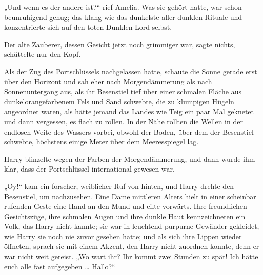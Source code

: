 „Und wenn es der andere ist?“ rief Amelia. Was sie gehört hatte, war schon beunruhigend genug; das klang wie das dunkelste aller dunklen Rituale und konzentrierte sich auf den toten Dunklen Lord selbst.

Der alte Zauberer, dessen Gesicht jetzt noch grimmiger war, sagte nichts, schüttelte nur den Kopf.

\later

Als der Zug des Portschlüssels nachgelassen hatte, schaute die Sonne gerade erst über den Horizont und sah eher nach Morgendämmerung als nach Sonnenuntergang aus, als ihr Besenstiel tief über einer schmalen Fläche aus dunkelorangefarbenem Fels und Sand schwebte, die zu klumpigen Hügeln angeordnet waren, als hätte jemand das Landes wie Teig ein paar Mal geknetet und dann vergessen, es flach zu rollen. In der Nähe rollten die Wellen in der endlosen Weite des Wassers vorbei, obwohl der Boden, über dem der Besenstiel schwebte, höchstens einige Meter über dem Meeresspiegel lag.

Harry blinzelte wegen der Farben der Morgendämmerung, und dann wurde ihm klar, dass der Portschlüssel international gewesen war.

„Oy!“ kam ein forscher, weiblicher Ruf von hinten, und Harry drehte den Besenstiel, um nachzusehen. Eine Dame mittleren Alters hielt in einer scheinbar rufenden Geste eine Hand an den Mund und eilte vorwärts. Ihre freundlichen Gesichtszüge, ihre schmalen Augen und ihre dunkle Haut kennzeichneten ein Volk, das Harry nicht kannte; sie war in leuchtend purpurne Gewänder gekleidet, wie Harry sie noch nie zuvor gesehen hatte; und als sich ihre Lippen wieder öffneten, sprach sie mit einem Akzent, den Harry nicht zuordnen konnte, denn er war nicht weit gereist.
„Wo wart ihr? Ihr kommt zwei Stunden zu spät! Ich hätte euch alle fast aufgegeben … Hallo?“

